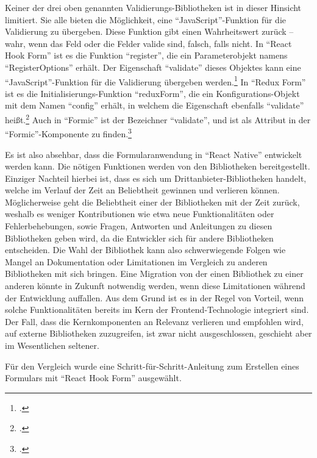Keiner der drei oben genannten Validierungs-Bibliotheken ist in dieser Hinsicht limitiert.
Sie alle bieten die Möglichkeit, eine \enquote{JavaScript}-Funktion für die Validierung zu übergeben.
Diese Funktion gibt einen Wahrheitswert zurück -- wahr, wenn das Feld oder die Felder valide sind, falsch, falls nicht.
In \enquote{React Hook Form} ist es die Funktion \enquote{register}, die ein Parameterobjekt namens \enquote{RegisterOptions} erhält.
Der Eigenschaft \enquote{validate} dieses Objektes kann eine \enquote{JavaScript}-Funktion für die Validierung übergeben werden.\footcite[Vgl.][]{RegisterReactHookFormAPI}
In \enquote{Redux Form} ist es die Initialisierungs-Funktion \enquote{reduxForm}, die ein Konfigurations-Objekt mit dem Namen \enquote{config} erhält, in welchem die Eigenschaft ebenfalls \enquote{validate} heißt.\footcite[Vgl.][]{ReduxFormReduxFormAPI}
Auch in \enquote{Formic} ist der Bezeichner \enquote{validate}, und ist als Attribut in der \enquote{Formic}-Komponente  zu finden.\footcite[Vgl.][]{FormikComponentFormikDocsAPI}


Es ist also absehbar, dass die Formularanwendung in \enquote{React Native} entwickelt werden kann.
Die nötigen Funktionen werden von den Bibliotheken bereitgestellt.
Einziger Nachteil hierbei ist, dass es sich um Drittanbieter-Bibliotheken handelt, welche im Verlauf der Zeit an Beliebtheit gewinnen und verlieren können.
Möglicherweise geht die Beliebtheit einer der Bibliotheken mit der Zeit zurück, weshalb es weniger Kontributionen wie etwa neue Funktionalitäten oder Fehlerbehebungen,
sowie Fragen, Antworten und Anleitungen zu diesen Bibliotheken geben wird, da die Entwickler sich für andere Bibliotheken entscheiden.
Die Wahl der Bibliothek kann also schwerwiegende Folgen wie Mangel an Dokumentation oder Limitationen im Vergleich zu anderen Bibliotheken mit sich bringen.
Eine Migration von der einen Bibliothek zu einer anderen könnte in Zukunft notwendig werden, wenn diese Limitationen während der Entwicklung auffallen.
Aus dem Grund ist es in der Regel von Vorteil, wenn solche Funktionalitäten bereits im Kern der Frontend-Technologie integriert sind.
Der Fall, dass die Kernkomponenten an Relevanz verlieren und empfohlen wird, auf externe Bibliotheken zuzugreifen, ist zwar nicht ausgeschlossen, geschieht aber im Wesentlichen seltener.

Für den Vergleich wurde eine Schritt-für-Schritt-Anleitung zum Erstellen eines Formulars mit \enquote{React Hook Form} ausgewählt.  

